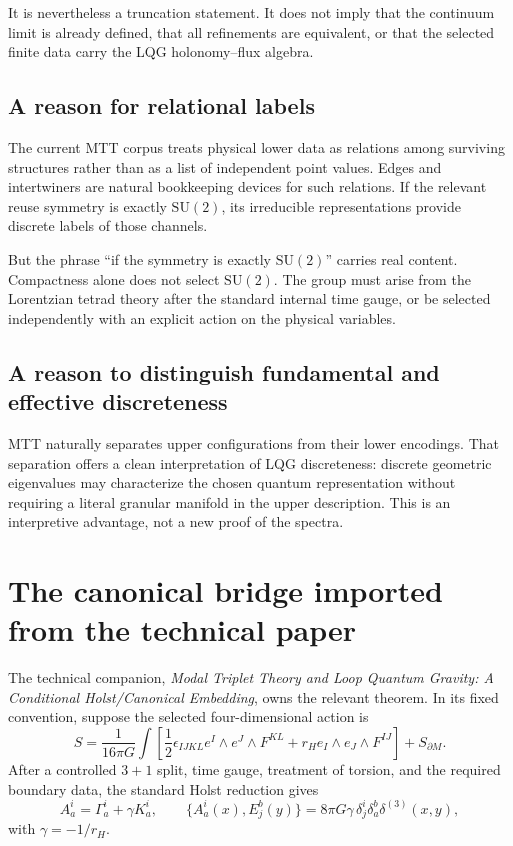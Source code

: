\documentclass[11pt]{article}
\begin{document}
It is nevertheless a truncation statement. It does not imply that the
continuum limit is already defined, that all refinements are equivalent, or
that the selected finite data carry the LQG holonomy--flux algebra.

\subsection{A reason for relational labels}

The current MTT corpus treats physical lower data as relations among
surviving structures rather than as a list of independent point values.
Edges and intertwiners are natural bookkeeping devices for such relations.
If the relevant reuse symmetry is exactly \(\mathrm{SU}(2)\), its irreducible
representations provide discrete labels of those channels.

But the phrase ``if the symmetry is exactly \(\mathrm{SU}(2)\)'' carries real
content. Compactness alone does not select \(\mathrm{SU}(2)\). The group must
arise from the Lorentzian tetrad theory after the standard internal time
gauge, or be selected independently with an explicit action on the physical
variables.

\subsection{A reason to distinguish fundamental and effective discreteness}

MTT naturally separates upper configurations from their lower encodings.
That separation offers a clean interpretation of LQG discreteness: discrete
geometric eigenvalues may characterize the chosen quantum representation
without requiring a literal granular manifold in the upper description.
This is an interpretive advantage, not a new proof of the spectra.

\section{The canonical bridge imported from the technical paper}

The technical companion, \emph{Modal Triplet Theory and Loop Quantum Gravity:
A Conditional Holst/Canonical Embedding}, owns the relevant theorem. In its
fixed convention, suppose the selected four-dimensional action is
\[
 S=
 \frac{1}{16\pi G}\int
 \left[
  \frac12\epsilon_{IJKL}e^I\wedge e^J\wedge F^{KL}
  +r_H e_I\wedge e_J\wedge F^{IJ}
 \right]+S_{\partial M}.
\]
After a controlled \(3+1\) split, time gauge, treatment of torsion, and the
required boundary data, the standard Holst reduction gives
\[
 A^i_a=\Gamma^i_a+\gamma K^i_a,
 \qquad
 \{A^i_a(x),E^b_j(y)\}
 =8\pi G\gamma\,\delta^i_j\delta^b_a\delta^{(3)}(x,y),
\]
with \(\gamma=-1/r_H\).
\end{document}
